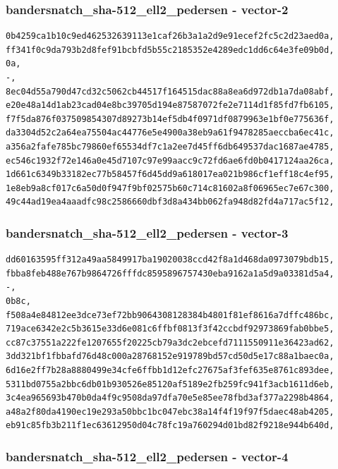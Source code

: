 \documentclass[
]{article}
\begin{document}
\subsubsection{bandersnatch\_sha-512\_ell2\_pedersen -
vector-2}\label{bandersnatch_sha-512_ell2_pedersen---vector-2}

\begin{verbatim}
0b4259ca1b10c9ed462532639113e1caf26b3a1a2d9e91ecef2fc5c2d23aed0a,
ff341f0c9da793b2d8fef91bcbfd5b55c2185352e4289edc1dd6c64e3fe09b0d,
0a,
-,
8ec04d55a790d47cd32c5062cb44517f164515dac88a8ea6d972db1a7da08abf,
e20e48a14d1ab23cad04e8bc39705d194e87587072fe2e7114d1f85fd7fb6105,
f7f5da876f037509854307d89273b14ef5db4f0971df0879963e1bf0e775636f,
da3304d52c2a64ea75504ac44776e5e4900a38eb9a61f9478285aeccba6ec41c,
a356a2fafe785bc79860ef65534df7c1a2ee7d45ff6db649537dac1687ae4785,
ec546c1932f72e146a0e45d7107c97e99aacc9c72fd6ae6fd0b0417124aa26ca,
1d661c6349b33182ec77b58457f6d45dd9a618017ea021b986cf1eff18c4ef95,
1e8eb9a8cf017c6a50d0f947f9bf02575b60c714c81602a8f06965ec7e67c300,
49c44ad19ea4aaadfc98c2586660dbf3d8a434bb062fa948d82fd4a717ac5f12,
\end{verbatim}

\subsubsection{bandersnatch\_sha-512\_ell2\_pedersen -
vector-3}\label{bandersnatch_sha-512_ell2_pedersen---vector-3}

\begin{verbatim}
dd60163595ff312a49aa5849917ba19020038ccd42f8a1d468da0973079bdb15,
fbba8feb488e767b9864726fffdc8595896757430eba9162a1a5d9a03381d5a4,
-,
0b8c,
f508a4e84812ee3dce73ef72bb9064308128384b4801f81ef8616a7dffc486bc,
719ace6342e2c5b3615e33d6e081c6ffbf0813f3f42ccbdf92973869fab0bbe5,
cc87c37551a222fe1207655f20225cb79a3dc2ebcefd7111550911e36423ad62,
3dd321bf1fbbafd76d48c000a28768152e919789bd57cd50d5e17c88a1baec0a,
6d16e2ff7b28a8880499e34cfe6ffbb1d12efc27675af3fef635e8761c893dee,
5311bd0755a2bbc6db01b930526e85120af5189e2fb259fc941f3acb1611d6eb,
3c4ea965693b470b0da4f9c9508da97dfa70e5e85ee78fbd3af377a2298b4864,
a48a2f80da4190ec19e293a50bbc1bc047ebc38a14f4f19f97f5daec48ab4205,
eb91c85fb3b211f1ec63612950d04c78fc19a760294d01bd82f9218e944b640d,
\end{verbatim}

\subsubsection{bandersnatch\_sha-512\_ell2\_pedersen -
vector-4}\label{bandersnatch_sha-512_ell2_pedersen---vector-4}
\end{document}
